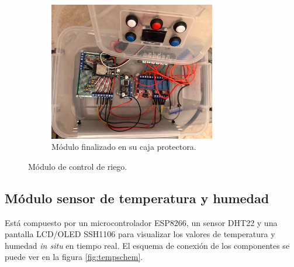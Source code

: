 \begin{figure}[!h]
      \begin{subfigure}[b]{0.45\textwidth}
	\centering
		\includegraphics[width=0.8\textwidth]{./Figures/control_riego3.jpg}
		\caption[Conexionado]{Módulo finalizado en su caja protectora.}
		\label{fig:riego3}
     \end{subfigure}	
     \hfill
        \caption[Módulo de control de riego]{Módulo de control de riego.}
        \label{fig:riego_control}
\end{figure}


 
\pagebreak

\subsection{Módulo sensor de temperatura y humedad}
\label{Hardware módulo sensor de temperatura y humedad}

Está compuesto por un microcontrolador ESP8266, un sensor DHT22 y una pantalla LCD/OLED SSH1106 para visualizar los valores de temperatura y humedad  \textit{in situ} en tiempo real. El esquema de conexión de los componentes se puede ver en la figura \ref{fig:tempschem}.

